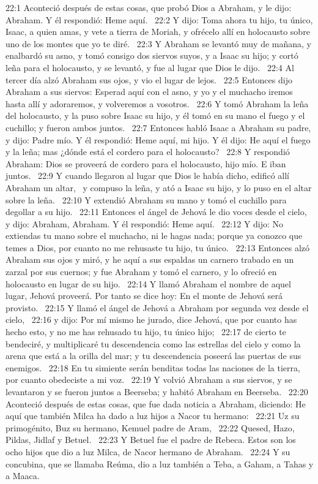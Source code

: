 22:1 Aconteció después de estas cosas, que probó Dios a Abraham, y le dijo: Abraham. Y él respondió: Heme aquí.  
22:2 Y dijo: Toma ahora tu hijo, tu único, Isaac, a quien amas, y vete a tierra de Moriah, y ofrécelo allí en holocausto sobre uno de los montes que yo te diré.  
22:3 Y Abraham se levantó muy de mañana, y enalbardó su asno, y tomó consigo dos siervos suyos, y a Isaac su hijo; y cortó leña para el holocausto, y se levantó, y fue al lugar que Dios le dijo.  
22:4 Al tercer día alzó Abraham sus ojos, y vio el lugar de lejos.  
22:5 Entonces dijo Abraham a sus siervos: Esperad aquí con el asno, y yo y el muchacho iremos hasta allí y adoraremos, y volveremos a vosotros.  
22:6 Y tomó Abraham la leña del holocausto, y la puso sobre Isaac su hijo, y él tomó en su mano el fuego y el cuchillo; y fueron ambos juntos.  
22:7 Entonces habló Isaac a Abraham su padre, y dijo: Padre mío. Y él respondió: Heme aquí, mi hijo. Y él dijo: He aquí el fuego y la leña; mas ¿dónde está el cordero para el holocausto?  
22:8 Y respondió Abraham: Dios se proveerá de cordero para el holocausto, hijo mío. E iban juntos.  
22:9 Y cuando llegaron al lugar que Dios le había dicho, edificó allí Abraham un altar,  y compuso la leña, y ató a Isaac su hijo, y lo puso en el altar sobre la leña.  
22:10 Y extendió Abraham su mano y tomó el cuchillo para degollar a su hijo.  
22:11 Entonces el ángel de Jehová le dio voces desde el cielo, y dijo: Abraham, Abraham. Y él respondió: Heme aquí.  
22:12 Y dijo: No extiendas tu mano sobre el muchacho, ni le hagas nada; porque ya conozco que temes a Dios, por cuanto no me rehusaste tu hijo, tu único.  
22:13 Entonces alzó Abraham sus ojos y miró, y he aquí a sus espaldas un carnero trabado en un zarzal por sus cuernos; y fue Abraham y tomó el carnero, y lo ofreció en holocausto en lugar de su hijo.  
22:14 Y llamó Abraham el nombre de aquel lugar, Jehová proveerá. Por tanto se dice hoy: En el monte de Jehová será provisto.  
22:15 Y llamó el ángel de Jehová a Abraham por segunda vez desde el cielo,  
22:16 y dijo: Por mí mismo he jurado, dice Jehová, que por cuanto has hecho esto, y no me has rehusado tu hijo, tu único hijo;  
22:17 de cierto te bendeciré, y multiplicaré tu descendencia como las estrellas del cielo y como la arena que está a la orilla del mar; y tu descendencia poseerá las puertas de sus enemigos.  
22:18 En tu simiente serán benditas todas las naciones de la tierra, por cuanto obedeciste a mi voz.  
22:19 Y volvió Abraham a sus siervos, y se levantaron y se fueron juntos a Beerseba; y habitó Abraham en Beerseba.  
22:20 Aconteció después de estas cosas, que fue dada noticia a Abraham, diciendo: He aquí que también Milca ha dado a luz hijos a Nacor tu hermano:  
22:21 Uz su primogénito, Buz su hermano, Kemuel padre de Aram,  
22:22 Quesed, Hazo, Pildas, Jidlaf y Betuel.  
22:23 Y Betuel fue el padre de Rebeca. Estos son los ocho hijos que dio a luz Milca, de Nacor hermano de Abraham.  
22:24 Y su concubina, que se llamaba Reúma, dio a luz también a Teba, a Gaham, a Tahas y a Maaca.  
